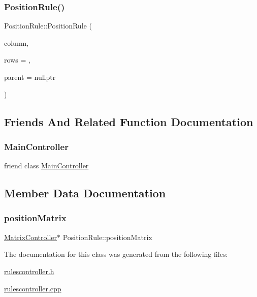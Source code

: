 \subsubsection{\texorpdfstring{Position\+Rule()}{PositionRule()}}
{\footnotesize\ttfamily Position\+Rule\+::\+Position\+Rule (\begin{DoxyParamCaption}\item[{int}]{column,  }\item[{int}]{rows = {},  }\item[{Q\+Widget $\ast$}]{parent = {\ttfamily nullptr} }\end{DoxyParamCaption})\hspace{0.3cm}{\ttfamily [explicit]}}



\subsection{Friends And Related Function Documentation}
\mbox{\label{class_position_rule_a154f5ffe46dc74c6c94311b4cc3927ae}} 
\subsubsection{\texorpdfstring{Main\+Controller}{MainController}}
{\footnotesize\ttfamily friend class \mbox{\hyperlink{class_main_controller}{Main\+Controller}}\hspace{0.3cm}{\ttfamily [friend]}}



\subsection{Member Data Documentation}
\mbox{\label{class_position_rule_a1b8c45dd4a95666a2f1826a063fba837}} 
\subsubsection{\texorpdfstring{position\+Matrix}{positionMatrix}}
{\footnotesize\ttfamily \mbox{\hyperlink{class_matrix_controller}{Matrix\+Controller}}$\ast$ Position\+Rule\+::position\+Matrix\hspace{0.3cm}{\ttfamily [private]}}



The documentation for this class was generated from the following files\+:\begin{DoxyCompactItemize}
\item 
\mbox{\hyperlink{rulescontroller_8h}{rulescontroller.\+h}}\item 
\mbox{\hyperlink{rulescontroller_8cpp}{rulescontroller.\+cpp}}\end{DoxyCompactItemize}
